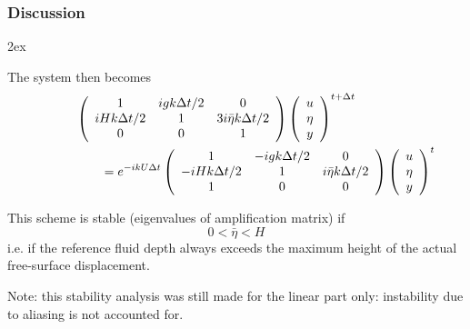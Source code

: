 \documentclass[aspectratio=149,9pt]{beamer}
\begin{document}
\begin{frame}
	\frametitle{Discussion}
	\begin{myitemize}{2ex}
		\item The system then becomes
			\begin{align*}
				&\left(\begin{array}{ccc}
					1	&	igk\Delta t/2	&	0	\\
					iHk\Delta t/2	&	1	& 3i\bar\eta k\Delta t/2	\\
					0	&	0	&	1
				\end{array}\right) \left(\begin{array}{c}u \\ \eta \\ y \end{array}\right)^{t+\Delta t}	\\
				&\qquad=
				e^{-ikU\Delta t}
				\left(\begin{array}{ccc}
					1	&	-igk\Delta t/2	&	0	\\
					-iHk\Delta t/2	&	1	&	i\bar\eta k\Delta t/2	\\
					1 & 0	&	0
				\end{array}\right) \left(\begin{array}{c}u \\ \eta \\ y \end{array}\right)^{t}\hspace*{-3em}
			\end{align*}
		\item This scheme is stable (eigenvalues of amplification matrix) if 
			\begin{equation*}
				0< \bar \eta < H
			\end{equation*}
			i.e. if the reference fluid depth always exceeds the maximum height of the actual free-surface displacement.
		\item Note: this stability analysis was still made for the linear part only: instability due to aliasing is not accounted for.
	\end{myitemize}
\end{frame}
%
%
\end{document}
